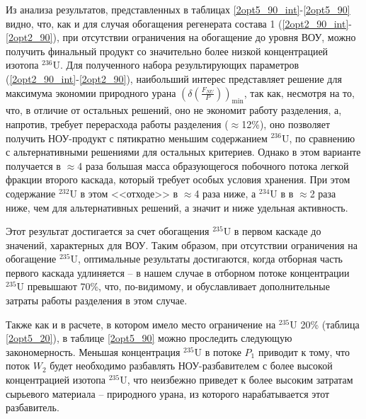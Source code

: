 Из анализа результатов, представленных в таблицах \ref{2opt5_90_int}-\ref{2opt5_90} видно, что, как и для случая обогащения регенерата состава 1 (\ref{2opt2_90_int}-\ref{2opt2_90}), при отсутствии ограничения на обогащение до уровня ВОУ, можно получить финальный продукт со значительно более низкой концентрацией изотопа $^{236}$U. Для полученного набора результирующих параметров (\ref{2opt2_90_int}-\ref{2opt2_90}), наибольший интерес представляет решение для максимума экономии природного урана $(\delta(\frac{F_{NU}}{P}))_\text{min}$, так как, несмотря на то, что, в отличие от остальных решений, оно не экономит работу разделения, а, напротив, требует перерасхода работы разделения ($\approx$12\%), оно позволяет получить НОУ-продукт с пятикратно меньшим содержанием $^{236}$U, по сравнению с альтернативными решениями для остальных критериев. Однако в этом варианте получается в $\approx$4 раза большая масса образующегося побочного потока легкой фракции второго каскада, который требует особых условия хранения. При этом содержание $^{232}$U в этом <<отходе>> в $\approx$4 раза ниже, а $^{234}$U в в $\approx$2 раза ниже, чем для альтернативных решений, а значит и ниже удельная активность.

Этот результат достигается за счет обогащения $^{235}$U в первом каскаде до значений, характерных для ВОУ. Таким образом, при отсутствии ограничения на обогащение $^{235}$U, оптимальные результаты достигаются, когда отборная часть первого каскада удлиняется -- в нашем случае в отборном потоке концентрации $^{235}$U превышают 70\%, что, по-видимому, и обуславливает дополнительные затраты работы разделения в этом случае.

Также как и в расчете, в котором имело место ограничение на $^{235}$U 20\% (таблица \ref{2opt5_20}), в таблице \ref{2opt5_90} можно проследить следующую закономерность. Меньшая концентрация $^{235}$U в потоке $P_{1}$ приводит к тому, что поток $W_{2}$ будет необходимо разбавлять НОУ-разбавителем с более высокой концентрацией изотопа $^{235}$U, что неизбежно приведет к более высоким затратам сырьевого материала -- природного урана, из которого нарабатывается этот разбавитель.



